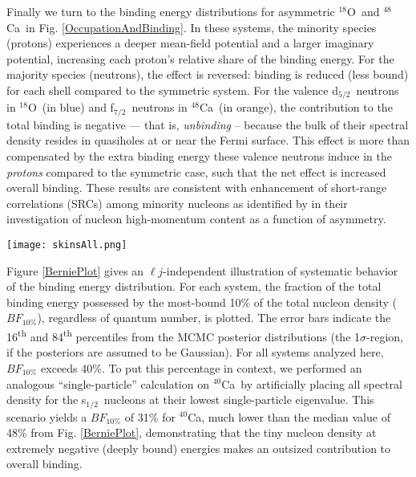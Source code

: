 \documentclass[twocolumn,secnumarabic,amssymb, nobibnotes, aps, prl, superscriptaddress, nobalancelastpage]{revtex4-1}
\newcommand{\oEight}{\ensuremath{^{18}}O}
\newcommand{\oSixEight}{\ensuremath{^{16,18}}O}
\newcommand{\caForty}{\ensuremath{^{40}}C\lowercase{a}}
\newcommand{\caEight}{\ensuremath{^{48}}C\lowercase{a}}
\newcommand{\caAughtEight}{\ensuremath{^{40,48}}C\lowercase{a}}
\newcommand{\niEightFour}{\ensuremath{^{58,64}}N\lowercase{i}}
\newcommand{\snTwelveFour}{\ensuremath{^{112,124}}S\lowercase{n}}
\newcommand{\pbEight}{\ensuremath{^{208}}P\lowercase{b}}
\newcommand{\sOne}{s\ensuremath{_{1/2}}}
\newcommand{\dFive}{d\ensuremath{_{5/2}}}
\newcommand{\fSeven}{f\ensuremath{_{7/2}}}
\begin{document}
Finally we turn to the binding energy distributions for asymmetric \oEight\ and
\caEight\ in Fig. \ref{OccupationAndBinding}. In these systems, the minority species (protons) experiences
a deeper mean-field potential and a larger imaginary potential, increasing each proton's relative share of
the binding energy. For the majority species (neutrons), the
effect is reversed: binding is reduced (less bound) for each shell compared to the symmetric
system. For the valence \dFive\ neutrons in \oEight\ (in blue) and \fSeven\ neutrons in \caEight\
(in orange), the contribution to the total binding is negative --- that is,
\textit{unbinding} -- because the bulk of their spectral density resides in quasiholes
at or near the Fermi surface. This effect is more than compensated by the extra
binding energy these valence neutrons induce in the \textit{protons} compared to the symmetric case,
such that the net effect is increased overall binding. These results are consistent with enhancement
of short-range correlations (SRCs) among minority nucleons as identified by \cite{Hen2012} in their
investigation of nucleon high-momentum content as a function of asymmetry.

\begin{figure*}[!htb]
    \texttt{[image: skinsAll.png]}
    \caption{\label{skinsPlot} Neutron-skin probabilities via MCMC sampling for
        \oSixEight, \caAughtEight, \niEightFour, \snTwelveFour, and \pbEight.
        Each axis shows a single element. For elements with two isotopes
        histogrammed, the lighter isotope is shown using light bars,
    and the heavier isotope is shown with dark bars. The heights of each 
    distribution have been arbitrarily rescaled to facilitate comparison.}
\end{figure*}

Figure \ref{BerniePlot} gives an $\ell j$-independent illustration of systematic behavior of the binding
energy distribution. For each system, the fraction of the total binding energy possessed
by the most-bound 10\% of the total nucleon density ($BF_{10\%}$), regardless of 
quantum number, is plotted. The error bars indicate the 16\textsuperscript{th} and 84\textsuperscript{th} percentiles
from the MCMC posterior distributions (the 1$\sigma$-region, if the posteriors are assumed to
be Gaussian). For all systems analyzed here, $BF_{10\%}$ exceeds 40\%.
To put this percentage in context, we performed an analogous ``single-particle'' calculation
on \caForty\ by artificially placing all spectral density for the \sOne\ nucleons at their lowest single-particle eigenvalue.
This scenario yields a $BF_{10\%}$ of 31\% for \caForty, much lower than the median value of
48\% from Fig. \ref{BerniePlot}, demonstrating that the tiny nucleon density at extremely negative (deeply bound)
energies makes an outsized contribution to overall binding.
\end{document}
